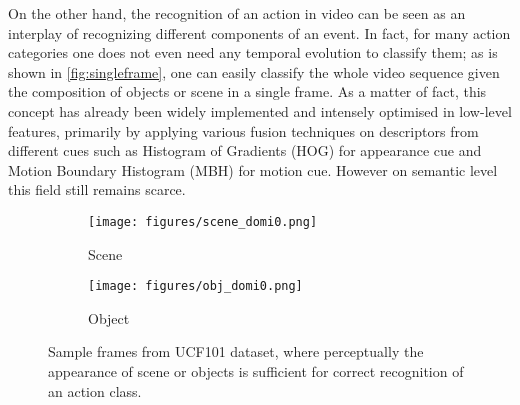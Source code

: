 On the other hand, the recognition of an action in video can be seen as an interplay of recognizing different components of an event. 
In fact, for many action categories one does not even need any temporal evolution to classify them; as is shown in \autoref{fig:singleframe}, one can easily classify the whole video sequence given the composition of objects or scene in a single frame. 
As a matter of fact, this concept has already been widely implemented and intensely optimised in low-level features, primarily by applying various fusion techniques \cite{peng2014bag} on descriptors from different cues such as Histogram of Gradients (HOG) \cite{laptev2008learning} for appearance cue and Motion Boundary Histogram (MBH) \cite{wang2013action} for motion cue. However on semantic level this field still remains scarce. 

\begin{figure}
\centering
\begin{subfigure}{0.30\textwidth}
	\texttt{[image: figures/scene\_domi0.png]}
\caption{Scene}\label{fig:scenedomi}
\end{subfigure}
\begin{subfigure}{0.30\textwidth}
	\texttt{[image: figures/obj\_domi0.png]}
\caption{Object}\label{fig:objdomi}
\end{subfigure}
\caption[Scene and object centric videos]{Sample frames from UCF101 dataset, where perceptually the appearance of scene or objects is sufficient for correct recognition of an action class.}\label{fig:singleframe}
\end{figure}

